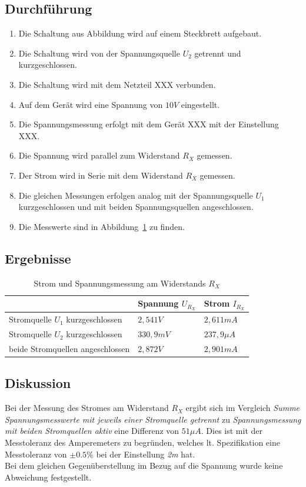 \documentclass[12pt,a4paper,titlepage]{article}
\begin{document}
\subsection{Durchf\"uhrung}
\begin{enumerate}
  \item Die Schaltung aus Abbildung wird auf einem Steckbrett aufgebaut.
  \item Die Schaltung wird von der Spannungsquelle $U_2$ getrennt und kurzgeschlossen.
  \item Die Schaltung wird mit dem Netzteil XXX verbunden.
  \item Auf dem Ger\"at wird eine Spannung von $10 V$ eingestellt.
  \item Die Spannungsmessung erfolgt mit dem Ger\"at XXX mit der Einstellung XXX.
  \item Die Spannung wird parallel zum Widerstand $R_X$ gemessen.
  \item Der Strom wird in Serie mit dem Widerstand $R_X$ gemessen.
  \item Die gleichen Messungen erfolgen analog mit der Spannungsquelle $U_1$ kurzgeschlossen und mit beiden Spannungsquellen angeschlossen.
  \item Die Messwerte sind in Abbildung~\ref{Figure4.4.5} zu finden.
\end{enumerate}

\subsection{Ergebnisse}
\begin{table}[H]
\centering
\begin{tabular}{|l|l|l|}
\hline
                                 & Spannung $U_{R_X}$ & Strom $I_{R_X}$      \\ \hline
Stromquelle $U_1$ kurzgeschlossen & $2,541 V$    & $2,611 mA$     \\ \hline
Stromquelle $U_2$ kurzgeschlossen & $330,9 mV$   & $237,9 \mu A$ \\ \hline
beide Stromquellen angeschlossen  & $2,872 V$    & $2,901 mA$ \\ \hline
\end{tabular}
\caption{Strom und Spannungsmessung am Widerstands $R_X$}
\label{Figure4.4.5}
\end{table}

\subsection{Diskussion}
Bei der Messung des Stromes am Widerstand $R_X$ ergibt sich im Vergleich \textit{Summe Spannungsmesswerte mit jeweils einer Stromquelle getrennt} zu \textit{Spannungsmessung mit beiden Stromquellen aktiv} eine Differenz von $51 \mu A$. Dies ist mit der Messtoleranz des Amperemeters zu begr\"unden, welches lt. Spezifikation eine Messtoleranz von $\pm0.5\%$ bei der Einstellung \textit{2m} hat. \\
Bei dem gleichen Gegen\"uberstellung im Bezug auf die Spannung wurde keine Abweichung festgestellt.
\end{document}
